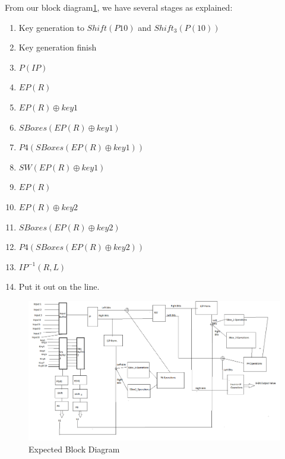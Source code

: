 \documentclass{article}
\begin{document}
From our block diagram\ref{fig:BlockDiagram}, we have several stages as explained:

\begin{enumerate}
  \item Key generation to $Shift(P10)$ and $Shift_{3}(P(10))$
  \item Key generation finish
  \item $P(IP)$
  \item $EP(R)$
  \item $EP(R) \oplus key1$
  \item $SBoxes(EP(R) \oplus key1)$
  \item $P4(SBoxes(EP(R) \oplus key1))$
  \item $SW(EP(R) \oplus key1)$
  \item $EP(R)$
  \item $EP(R) \oplus key2$
  \item $SBoxes(EP(R) \oplus key2)$
  \item $P4(SBoxes(EP(R) \oplus key2))$
  \item $IP^{-1}(R,L)$
  \item Put it out on the line.
\end{enumerate}


\begin{figure}
  \includegraphics[width=\linewidth]{../img/BlockDiagram_Milestone1.png}
  \caption{Expected Block Diagram}
  \label{fig:BlockDiagram}
\end{figure}
\end{document}

